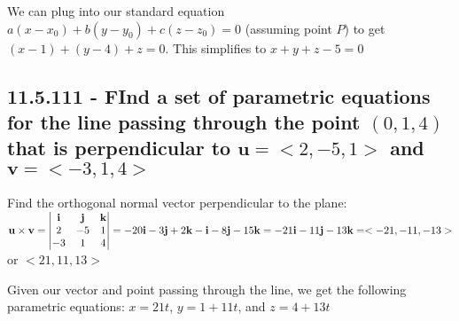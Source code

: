 \documentclass{article}
\begin{document}
\par\noindent\large We can plug into our standard equation $a(x - x_{0}) + b(y - y_{0}) + c(z - z_{0}) = 0$ (assuming point $P$) to get $(x - 1) + (y - 4) + z = 0$.  This simplifies to $x + y + z - 5 = 0$

\subsection{11.5.111 - FInd a set of parametric equations for the line passing through the point $(0, 1, 4)$ that is perpendicular to $\textbf{u} = <2, -5, 1>$ and $\textbf{v} = <-3, 1, 4>$}

\par\noindent\large Find the orthogonal normal vector perpendicular to the plane: $\textbf{u} \times \textbf{v} = \begin{vmatrix}
\textbf{i} & \textbf{j} & \textbf{k} \\ 
2 & -5 & 1 \\ 
-3 & 1 & 4  \notag
\end{vmatrix} = \linebreak -20\textbf{i} - 3\textbf{j} + 2\textbf{k} - \textbf{i} - 8\textbf{j} - 15\textbf{k} = -21\textbf{i} - 11\textbf{j} - 13\textbf{k} = <-21, -11, -13>$ or $<21, 11, 13>$\vspace{0.25cm}

\par\noindent\large Given our vector and point passing through the line, we get the following parametric equations: $x = 21t$, $y = 1 + 11t$, and $z = 4 + 13t$
\end{document}
